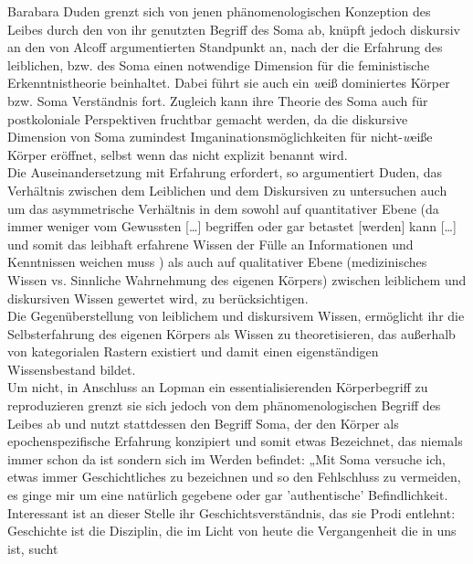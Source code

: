 Barabara Duden grenzt sich von jenen phänomenologischen Konzeption des Leibes
durch den von ihr genutzten Begriff des Soma ab, knüpft jedoch diskursiv an den
von Alcoff argumentierten Standpunkt an, nach der die Erfahrung des leiblichen,
bzw. des Soma einen notwendige Dimension für die feministische
Erkenntnistheorie beinhaltet. Dabei führt sie auch ein \textit{w}eiß dominiertes Körper
bzw. Soma Verständnis fort. Zugleich kann ihre Theorie des Soma auch für
postkoloniale Perspektiven fruchtbar gemacht werden, da die diskursive
Dimension von Soma zumindest Imganinationsmöglichkeiten für nicht-\textit{w}eiße Körper
eröffnet, selbst wenn das nicht explizit benannt wird.\\

\noindent Die Auseinandersetzung mit Erfahrung erfordert, so argumentiert Duden, das
Verhältnis zwischen dem Leiblichen und dem Diskursiven zu untersuchen auch um
das asymmetrische Verhältnis in dem sowohl auf quantitativer Ebene (\glqq da immer
weniger vom Gewussten […] begriffen oder gar betastet [werden] kann […] und
somit das leibhaft erfahrene Wissen der Fülle an Informationen und Kenntnissen
weichen muss \grqq) \footnotemark {} als auch auf qualitativer Ebene (medizinisches Wissen vs.
Sinnliche Wahrnehmung des eigenen Körpers) zwischen leiblichem und diskursiven
Wissen gewertet wird, zu berücksichtigen.\\

\noindent Die Gegenüberstellung von leiblichem und diskursivem Wissen, ermöglicht ihr die
Selbsterfahrung des eigenen Körpers als Wissen zu theoretisieren, das außerhalb
von kategorialen Rastern existiert und damit einen eigenständigen
Wissensbestand bildet. \\
Um nicht, in Anschluss an Lopman ein essentialisierenden
Körperbegriff zu reproduzieren grenzt sie sich jedoch von dem
phänomenologischen Begriff des Leibes ab und nutzt stattdessen den Begriff
Soma, der den Körper als \glqq epochenspezifische Erfahrung \grqq \footnotemark
{} konzipiert und somit
etwas Bezeichnet, das niemals immer schon da ist sondern sich im Werden
befindet: „Mit Soma versuche ich, etwas immer Geschichtliches zu bezeichnen und
so den Fehlschluss zu vermeiden, es ginge mir um eine natürlich gegebene oder
gar 'authentische' Befindlichkeit. Interessant ist an dieser Stelle ihr
Geschichtsverständnis, das sie Prodi entlehnt: \glqq [...] Geschichte ist die
Disziplin, die im Licht von heute die Vergangenheit die in uns ist, sucht \grqq
\footnotemark {}\\

